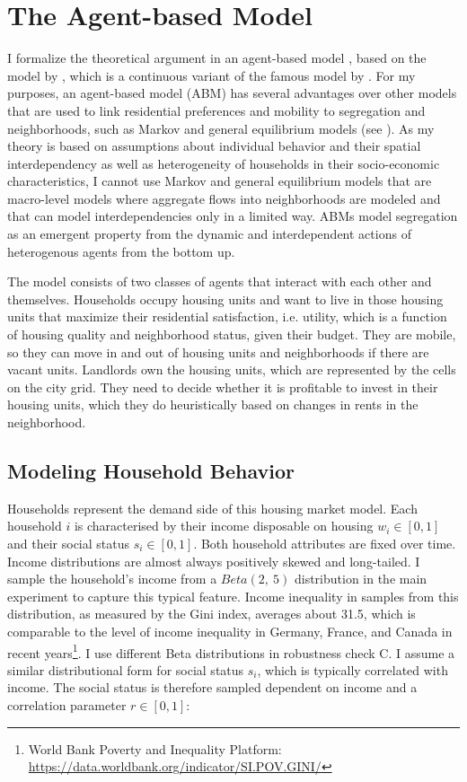 \section{The Agent-based Model}

I formalize the theoretical argument in an agent-based model \citep{macyFactorsActorsComputational2002, axtellAgentBasedModelingEconomics2025}, based on the model by \citet{benardWealthStatusBasedModel2007}, which is a continuous variant of the famous model by \citet{schellingDynamicModelsSegregation1971}. For my purposes, an agent-based model (ABM) has several advantages over other models that are used to link residential preferences and mobility to segregation and neighborhoods, such as Markov and general equilibrium models (see \cite[140ff]{bruchMethodologicalIssuesAnalysis2012}). As my theory is based on assumptions about individual behavior and their spatial interdependency as well as heterogeneity of households in their socio-economic characteristics, I cannot use Markov and general equilibrium models that are macro-level models where aggregate flows into neighborhoods are modeled and that can model interdependencies only in a limited way. ABMs model segregation as an emergent property from the dynamic and interdependent actions of heterogenous agents from the bottom up.

The model consists of two classes of agents that interact with each other and themselves. Households occupy housing units and want to live in those housing units that maximize their residential satisfaction, i.e. utility, which is a function of housing quality and neighborhood status, given their budget. They are mobile, so they can move in and out of housing units and neighborhoods if there are vacant units. Landlords own the housing units, which are represented by the cells on the city grid. They need to decide whether it is profitable to invest in their housing units, which they do heuristically based on changes in rents in the neighborhood.

\subsection{Modeling Household Behavior}

Households represent the demand side of this housing market model. Each household $i$ is characterised by their income disposable on housing $w_i \in [0, 1]$ and their social status $s_i \in [0, 1]$. Both household attributes are fixed over time. Income distributions are almost always positively skewed and long-tailed. I sample the household's income from a $Beta(2, \ 5)$ distribution in the main experiment to capture this typical feature. Income inequality in samples from this distribution, as measured by the Gini index, averages about 31.5, which is comparable to the level of income inequality in Germany, France, and Canada in recent years\footnote{World Bank Poverty and Inequality Platform: \url{https://data.worldbank.org/indicator/SI.POV.GINI/}}. I use different Beta distributions in robustness check C. I assume a similar distributional form for social status $s_i$, which is typically correlated with income. The social status is therefore sampled dependent on income and a correlation parameter $r \in [0, 1]$: 


